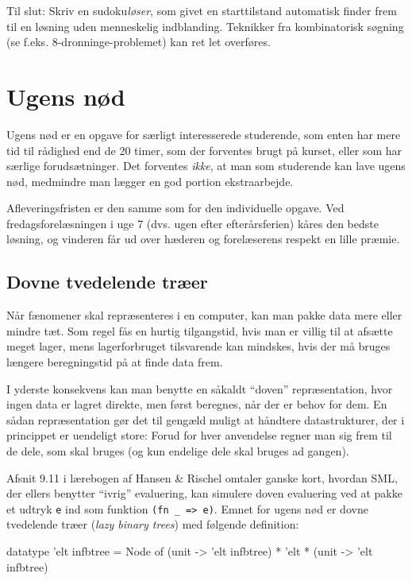 \documentclass[a4paper]{article}
\newenvironment{program}{\begin{flushleft}\ttfamily\begin{tabbing}}%
{\end{tabbing}\end{flushleft}}
\begin{document}

Til slut: Skriv en sudoku\emph{l{\o}ser}, som givet en starttilstand automatisk finder frem til en
l{\o}sning uden menneskelig indblanding. Teknikker fra kombinatorisk s{\o}gning
(se f.eks. 8-dronninge-problemet) kan ret let overf{\o}res.

\section{Ugens n{\o}d}
Ugens n{\o}d er en opgave for s{\ae}rligt interesserede studerende,
som enten har mere tid til r{\aa}dighed end de 20 timer, som der
forventes brugt p{\aa} kurset, eller som har s{\ae}rlige
foruds{\ae}tninger. Det forventes \emph{ikke}, at man som studerende
kan lave ugens n{\o}d, medmindre man l{\ae}gger en god portion
ekstraarbejde.

Afleveringsfristen er den samme som for den individuelle opgave. Ved
fredagsforelæsningen i uge 7 (dvs. ugen efter efterårsferien) kåres
den bedste løsning, og vinderen får ud over h{\ae}deren og
forel{\ae}serens respekt en lille præmie.

\subsection*{Dovne tvedelende tr{\ae}er}

N{\aa}r f{\ae}nomener skal repr{\ae}senteres i en computer,
kan man pakke data mere eller mindre t{\ae}t.  Som regel f{\aa}s en
hurtig tilgangstid, hvis man er villig til at afs{\ae}tte meget lager,
mens lagerforbruget tilsvarende kan mindskes, hvis der m{\aa} bruges
l{\ae}ngere beregningstid p{\aa} at finde data frem.

I yderste konsekvens kan man benytte en s{\aa}kaldt ``doven'' repr{\ae}sentation,
hvor ingen data er lagret direkte, men f{\o}rst beregnes, n{\aa}r der er
behov for dem.  En s{\aa}dan repr{\ae}sentation g{\o}r det til geng{\ae}ld
muligt at h{\aa}ndtere datastrukturer, der i princippet er uendeligt store:
Forud for hver anvendelse regner man sig frem til de dele, som skal bruges
(og kun endelige dele skal bruges ad gangen).

Afsnit 9.11 i l{\ae}rebogen af Hansen \& Rischel omtaler ganske kort,
hvordan SML, der ellers benytter ``ivrig'' evaluering, kan simulere
doven evaluering ved at pakke et udtryk \texttt{e} ind som funktion\newline
\texttt{(fn \_ => e)}.  Emnet for ugens n{\o}d er dovne tvedelende tr{\ae}er
(\emph{lazy binary trees}) med f{\o}lgende definition:
\begin{program}
datatype 'elt infbtree = Node of (unit -> 'elt infbtree) * 'elt * (unit -> 'elt infbtree)
\end{program}
\end{document}
